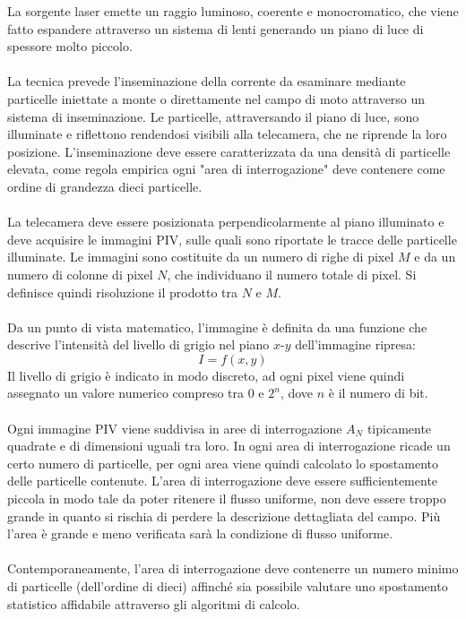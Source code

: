 La sorgente laser emette un raggio luminoso, coerente e monocromatico, che viene fatto espandere attraverso un sistema di lenti generando un piano di luce di spessore molto piccolo.\\\\
La tecnica prevede l'inseminazione della corrente da esaminare mediante particelle iniettate a monte o direttamente nel campo di moto attraverso un sistema di inseminazione. Le particelle, attraversando il piano di luce, sono illuminate e riflettono rendendosi visibili alla telecamera, che ne riprende la loro posizione. L'inseminazione deve essere caratterizzata da una densità di particelle elevata, come regola empirica ogni "area di interrogazione" deve contenere come ordine di grandezza dieci particelle.\\\\
La telecamera deve essere posizionata perpendicolarmente al piano illuminato e deve acquisire le immagini PIV, sulle quali sono riportate le tracce delle particelle illuminate. Le immagini sono costituite da un numero di righe di pixel $M$ e da un numero di colonne di pixel $N$, che individuano il numero totale di pixel. Si definisce quindi risoluzione il prodotto tra $N$ e $M$.\\\\
Da un punto di vista matematico, l'immagine è definita da una funzione che descrive l'intensità del livello di grigio nel piano $x$-$y$ dell'immagine ripresa:
\begin{equation*}
    I = f(x,y)
\end{equation*}
Il livello di grigio è indicato in modo discreto, ad ogni pixel viene quindi assegnato un valore numerico compreso tra 0 e $2^n$, dove $n$ è il numero di bit.\\\\
Ogni immagine PIV viene suddivisa in aree di interrogazione $A_N$ tipicamente quadrate e di dimensioni uguali tra loro. In ogni area di interrogazione ricade un certo numero di particelle, per ogni area viene quindi calcolato lo spostamento delle particelle contenute. L'area di interrogazione deve essere sufficientemente piccola in modo tale da poter ritenere il flusso uniforme, non deve essere troppo grande in quanto si rischia di perdere la descrizione dettagliata del campo. Più l'area è grande e meno verificata sarà la condizione di flusso uniforme.\\\\
Contemporaneamente, l'area di interrogazione deve contenerre un numero minimo di particelle (dell'ordine di dieci) affinché sia possibile valutare uno spostamento statistico affidabile attraverso gli algoritmi di calcolo.\\\\
